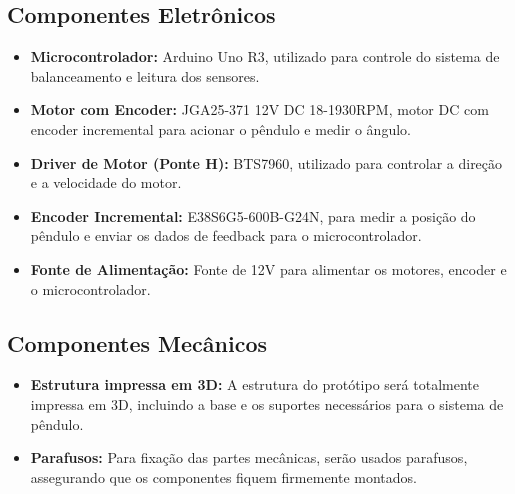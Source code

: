 \documentclass[9pt,a4paper,twocolumn,twoside]{tau-class/tau}
\begin{document}
    \subsection{Componentes Eletrônicos}
    \begin{itemize}
        \item \textbf{Microcontrolador:} Arduino Uno R3, utilizado para controle do sistema de balanceamento e leitura dos sensores.
        \item \textbf{Motor com Encoder:} JGA25-371 12V DC 18-1930RPM, motor DC com encoder incremental para acionar o pêndulo e medir o ângulo.
        \item \textbf{Driver de Motor (Ponte H):} BTS7960, utilizado para controlar a direção e a velocidade do motor.
        \item \textbf{Encoder Incremental:} E38S6G5-600B-G24N, para medir a posição do pêndulo e enviar os dados de feedback para o microcontrolador.
        \item \textbf{Fonte de Alimentação:} Fonte de 12V para alimentar os motores, encoder e o microcontrolador.
    \end{itemize}

    \subsection{Componentes Mecânicos}
    \begin{itemize}
        \item \textbf{Estrutura impressa em 3D:} A estrutura do protótipo será totalmente impressa em 3D, incluindo a base e os suportes necessários para o sistema de pêndulo.
        \item \textbf{Parafusos:} Para fixação das partes mecânicas, serão usados parafusos, assegurando que os componentes fiquem firmemente montados.
    \end{itemize}
    
\end{document}
